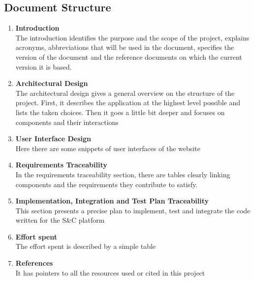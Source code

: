 
\subsection{Document Structure}
    \begin{enumerate}
        \item\textbf{Introduction}\\
        The introduction identifies the purpose and the scope of the project, explains acronyms, abbreviations that will be used in the document, specifies the version of the document and the reference documents on which the current version it is based.
        \item\textbf{Architectural Design}\\
        The architectural design gives a general overview on the structure of the project. First, it describes the application at the highest level possible and lists the taken choices. Then it goes a little bit deeper and focuses on components and their interactions
        \item\textbf{User Interface Design} \\
        Here there are some snippets of user interfaces of the website
        \item\textbf{Requirements Traceability} \\
        In the requirements traceability section, there are tables clearly linking components and the requirements they contribute to satisfy.
        \item\textbf{Implementation, Integration and Test Plan Traceability} \\ 
         This section presents a precise plan to implement, test and integrate the code written for the S\&C platform
        \item\textbf{Effort spent} \\
        The effort spent is described by a simple table
        \item\textbf{References}\\
        It has pointers to all the resources used or cited in this project
    \end{enumerate}



